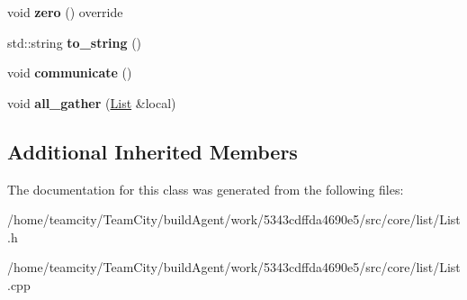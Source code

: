 \begin{DoxyCompactItemize}
\item 
void {\bfseries zero} () override\hypertarget{classList_aabaae7c14a6dfea6ae960372318d056a}{}\label{classList_aabaae7c14a6dfea6ae960372318d056a}

\item 
std\+::string {\bfseries to\+\_\+string} ()\hypertarget{classList_a342d5bda97e6150e07f3d403946cf452}{}\label{classList_a342d5bda97e6150e07f3d403946cf452}

\item 
void {\bfseries communicate} ()\hypertarget{classList_abd69e9175663739fd25ddca946e316b8}{}\label{classList_abd69e9175663739fd25ddca946e316b8}

\item 
void {\bfseries all\+\_\+gather} (\hyperlink{classList}{List} \&local)\hypertarget{classList_a907fcdc7cdd8446d3dd8763508e8a1e9}{}\label{classList_a907fcdc7cdd8446d3dd8763508e8a1e9}

\end{DoxyCompactItemize}
\subsection*{Additional Inherited Members}


The documentation for this class was generated from the following files\+:\begin{DoxyCompactItemize}
\item 
/home/teamcity/\+Team\+City/build\+Agent/work/5343cdffda4690e5/src/core/list/List.\+h\item 
/home/teamcity/\+Team\+City/build\+Agent/work/5343cdffda4690e5/src/core/list/List.\+cpp\end{DoxyCompactItemize}
